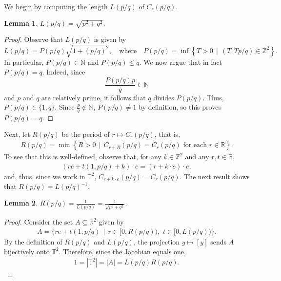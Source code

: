 \documentclass[12pt]{amsart}
\newtheorem{lemma}{Lemma}
\begin{document}
We begin by computing the length $L(p/q)$ of $C_{r}(p/q)$. 

	\begin{lemma} \label{L: length cycle} $L(p/q) = \sqrt{ p^{2} + q^{2 }}$. \end{lemma}
	
		\begin{proof} Observe that $L(p/q)$ is given by
			\begin{equation*}
				L(p/q) = P(p/q) \sqrt{ 1 + ( p/ q)^{2} } , \quad \text{where} \quad P(p/q) =  \inf \left\{ T > 0 \, \mid \, (T,Tp/q) \in \mathbb{Z}^{2} \right\}.
			\end{equation*}
In particular, $P(p/q) \in \mathbb{N}$ and $P(p/q) \leq q$. We now argue that in fact $ P(p/q) = q$. Indeed, since
	\begin{equation*}
		\frac{P(p/q) p}{q} \in \mathbb{N}
	\end{equation*}
and $p$ and $q$ are relatively prime, it follows that $q$ divides $P(p/q)$. Thus, $ P(p/q) \in \{1,q\}$. Since $ \frac{ p }{ q } \notin \mathbb{N} $, $ P(p/q) \neq 1 $ by definition, so this proves $ P(p/q) = q $.  \end{proof}

Next, let $R(p/q)$ be the period of $r \mapsto C_{r}(p/q)$, that is,
	\begin{align*}
		R(p/q) = \min \left\{ R > 0 \, \mid \, C_{r + R}(p/q) = C_{r}(p/q) \, \, \text{for each} \, \, r \in \mathbb{R} \right\}.
	\end{align*}
To see that this is well-defined, observe that, for any $k \in \mathbb{Z}^{2}$ and any $r, t \in \mathbb{R}$,
	\begin{align*}
		( re + t(1,p/q) + k ) \cdot e = (r + k \cdot e ) \cdot e,
	\end{align*}
and, thus, since we work in $\mathbb{T}^{2}$, $C_{r + k \cdot e }(p/q) = C_{r}(p/q)$.  The next result shows that $R(p/q) = L(p/q)^{-1}$.

	\begin{lemma} \label{L: period cycle} $R(p/q) = \frac{1}{ L(p/q) } = \frac{ 1 }{ \sqrt{ p^{2} + q^{2} } }$. \end{lemma}
	
		\begin{proof} Consider the set $A \subseteq \mathbb{R}^{2}$ given by 
			\begin{align*}
				A = \{ r e + t (1,p/q) \, \mid \, r \in [0,R(p/q)), \, \, t \in [0,L(p/q)) \}.
			\end{align*}
		By the definition of $R(p/q)$ and $L(p/q)$, the projection $y \mapsto [y]$ sends $A$ bijectively onto $\mathbb{T}^{2}$.  Therefore, since the Jacobian equals one,
			\begin{align*}
				1 = | \mathbb{T}^{2} | = |A| = L(p/q) R(p/q).
			\end{align*}
		\end{proof}
\end{document}
